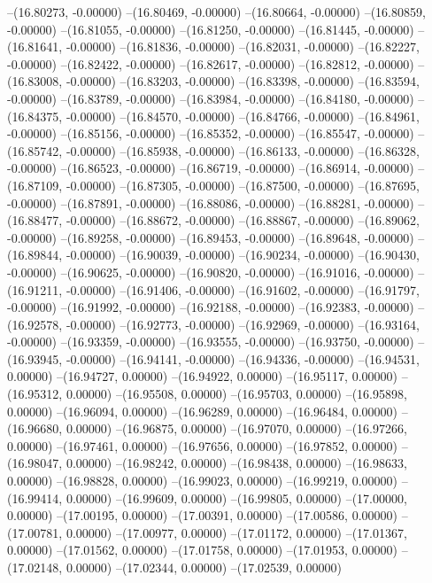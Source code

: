 --(16.80273, -0.00000)
--(16.80469, -0.00000)
--(16.80664, -0.00000)
--(16.80859, -0.00000)
--(16.81055, -0.00000)
--(16.81250, -0.00000)
--(16.81445, -0.00000)
--(16.81641, -0.00000)
--(16.81836, -0.00000)
--(16.82031, -0.00000)
--(16.82227, -0.00000)
--(16.82422, -0.00000)
--(16.82617, -0.00000)
--(16.82812, -0.00000)
--(16.83008, -0.00000)
--(16.83203, -0.00000)
--(16.83398, -0.00000)
--(16.83594, -0.00000)
--(16.83789, -0.00000)
--(16.83984, -0.00000)
--(16.84180, -0.00000)
--(16.84375, -0.00000)
--(16.84570, -0.00000)
--(16.84766, -0.00000)
--(16.84961, -0.00000)
--(16.85156, -0.00000)
--(16.85352, -0.00000)
--(16.85547, -0.00000)
--(16.85742, -0.00000)
--(16.85938, -0.00000)
--(16.86133, -0.00000)
--(16.86328, -0.00000)
--(16.86523, -0.00000)
--(16.86719, -0.00000)
--(16.86914, -0.00000)
--(16.87109, -0.00000)
--(16.87305, -0.00000)
--(16.87500, -0.00000)
--(16.87695, -0.00000)
--(16.87891, -0.00000)
--(16.88086, -0.00000)
--(16.88281, -0.00000)
--(16.88477, -0.00000)
--(16.88672, -0.00000)
--(16.88867, -0.00000)
--(16.89062, -0.00000)
--(16.89258, -0.00000)
--(16.89453, -0.00000)
--(16.89648, -0.00000)
--(16.89844, -0.00000)
--(16.90039, -0.00000)
--(16.90234, -0.00000)
--(16.90430, -0.00000)
--(16.90625, -0.00000)
--(16.90820, -0.00000)
--(16.91016, -0.00000)
--(16.91211, -0.00000)
--(16.91406, -0.00000)
--(16.91602, -0.00000)
--(16.91797, -0.00000)
--(16.91992, -0.00000)
--(16.92188, -0.00000)
--(16.92383, -0.00000)
--(16.92578, -0.00000)
--(16.92773, -0.00000)
--(16.92969, -0.00000)
--(16.93164, -0.00000)
--(16.93359, -0.00000)
--(16.93555, -0.00000)
--(16.93750, -0.00000)
--(16.93945, -0.00000)
--(16.94141, -0.00000)
--(16.94336, -0.00000)
--(16.94531, 0.00000)
--(16.94727, 0.00000)
--(16.94922, 0.00000)
--(16.95117, 0.00000)
--(16.95312, 0.00000)
--(16.95508, 0.00000)
--(16.95703, 0.00000)
--(16.95898, 0.00000)
--(16.96094, 0.00000)
--(16.96289, 0.00000)
--(16.96484, 0.00000)
--(16.96680, 0.00000)
--(16.96875, 0.00000)
--(16.97070, 0.00000)
--(16.97266, 0.00000)
--(16.97461, 0.00000)
--(16.97656, 0.00000)
--(16.97852, 0.00000)
--(16.98047, 0.00000)
--(16.98242, 0.00000)
--(16.98438, 0.00000)
--(16.98633, 0.00000)
--(16.98828, 0.00000)
--(16.99023, 0.00000)
--(16.99219, 0.00000)
--(16.99414, 0.00000)
--(16.99609, 0.00000)
--(16.99805, 0.00000)
--(17.00000, 0.00000)
--(17.00195, 0.00000)
--(17.00391, 0.00000)
--(17.00586, 0.00000)
--(17.00781, 0.00000)
--(17.00977, 0.00000)
--(17.01172, 0.00000)
--(17.01367, 0.00000)
--(17.01562, 0.00000)
--(17.01758, 0.00000)
--(17.01953, 0.00000)
--(17.02148, 0.00000)
--(17.02344, 0.00000)
--(17.02539, 0.00000)

